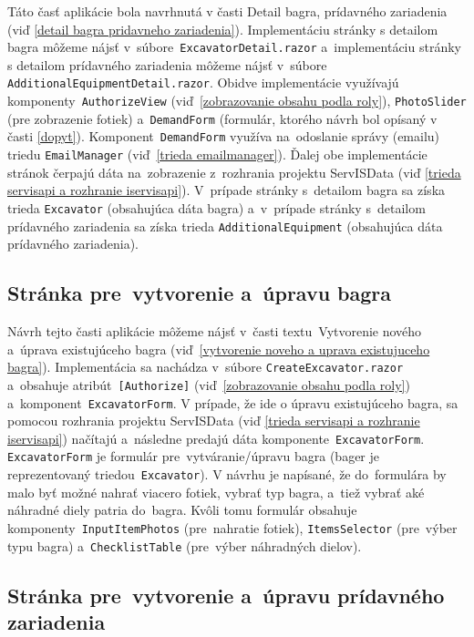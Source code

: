 Táto časť aplikácie bola navrhnutá v časti Detail bagra, prídavného zariadenia (viď \ref{detail bagra pridavneho zariadenia}). Implementáciu stránky s detailom bagra môžeme nájsť v~súbore~\verb|ExcavatorDetail.razor| a~implementáciu stránky s detailom prídavného zariadenia môžeme nájsť v~súbore \verb|AdditionalEquipmentDetail.razor|. Obidve implementácie využívajú komponenty~\verb|AuthorizeView| (viď~\ref{zobrazovanie obsahu podla roly}), \verb|PhotoSlider| (pre zobrazenie fotiek) a~\verb|DemandForm| (formulár, ktorého návrh bol opísaný v časti \ref{dopyt}). Komponent~\verb|DemandForm| využíva na~odoslanie správy (emailu) triedu \verb|EmailManager| (viď~\ref{trieda emailmanager}). Ďalej obe implementácie stránok čerpajú dáta na~zobrazenie z~rozhrania projektu ServISData (viď \ref{trieda servisapi a rozhranie iservisapi}). V~prípade stránky s~detailom bagra sa získa trieda \verb|Excavator| (obsahujúca dáta bagra) a~v~prípade stránky s~detailom prídavného zariadenia sa získa trieda \verb|AdditionalEquipment| (obsahujúca dáta prídavného zariadenia).

\subsection{Stránka pre~vytvorenie a~úpravu bagra}
\label{stranka pre vytvorenie a upravu bagra}

Návrh tejto časti aplikácie môžeme nájsť v~časti textu~Vytvorenie nového a~úprava existujúceho bagra (viď~\ref{vytvorenie noveho a uprava existujuceho bagra}). Implementácia sa nachádza v~súbore \verb|CreateExcavator.razor| a~obsahuje atribút~\verb|[Authorize]| (viď~\ref{zobrazovanie obsahu podla roly}) a~komponent~\verb|ExcavatorForm|. V prípade, že ide o úpravu existujúceho bagra, sa pomocou rozhrania projektu ServISData (viď \ref{trieda servisapi a rozhranie iservisapi}) načítajú a~následne predajú dáta komponente~\verb|ExcavatorForm|. \verb|ExcavatorForm| je formulár pre~vytváranie/úpravu bagra (bager je reprezentovaný triedou~\verb|Excavator|). V návrhu je napísané, že do~formulára by malo byť možné nahrať viacero fotiek, vybrať typ bagra, a~tiež vybrať aké náhradné diely patria do~bagra. Kvôli tomu formulár obsahuje komponenty~\verb|InputItemPhotos| (pre~nahratie fotiek), \verb|ItemsSelector| (pre~výber typu bagra) a~\verb|ChecklistTable| (pre~výber náhradných dielov).

\subsection{Stránka pre~vytvorenie a~úpravu prídavného zariadenia}

